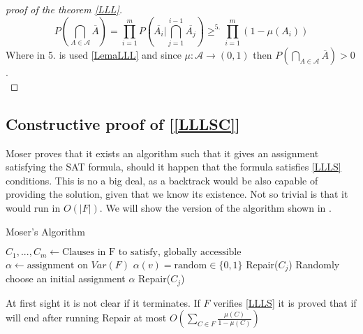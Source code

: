 \begin{proof}[proof of the theorem \ref{LLL}]
\[
P\left ( \bigcap_{A\in \mathcal{A}} \overline{A}\right ) = \prod_{i=1}^m P \left( \overline{A_i} \Big | \bigcap_{j=1}^{i-1} \overline{A_j}\right) \ge^{5.} \prod_{i=1}^m ( 1 - \mu(A_i))
\]
	Where in 5. is used \ref{LemaLLL} and since $\mu:\mathcal{A}\to (0,1)$ then $P\left ( \bigcap_{A\in \mathcal{A}} \overline{A}\right )  > 0$.\\
\end{proof}


\subsection{Constructive proof of [\ref{LLLSC}]}

Moser\cite{moser2013exact} proves that it exists an algorithm such that it gives an assignment satisfying the SAT formula, should it happen that the formula satisfies \ref{LLLS} conditions. This is no a big deal, as a backtrack would be also capable of providing the solution, given that we know its existence. Not so trivial is that it would run in $O(|F|)$. We will show the version of the algorithm shown in \cite{schoning2013satisfiability}.



\begin{algorithm}
\caption{Moser's Algorithm}\label{euclid}
\begin{algorithmic}[1]
  \State $C_1,...,C_m \gets \text{Clauses in F to satisfy, globally accessible}$
  \State $\alpha \gets \text{assignment on }Var(F)$
  \State
  \State $\alpha(v) = \text{random} \in \{0,1\}$
  \EndFor
  \State Repair($C_j$)
  \EndIf
  \EndFor
  \EndProcedure
  \State
  \State Randomly choose an initial assignment $\alpha$
  \State Repair($C_j$)

\end{algorithmic}
\end{algorithm}


At first sight it is not clear if it terminates. If $F$ verifies \ref{LLLS} it is proved that if will end after running Repair at most  $O(\sum_{C\in F} \frac{\mu(C)}{1-\mu(C)})$


